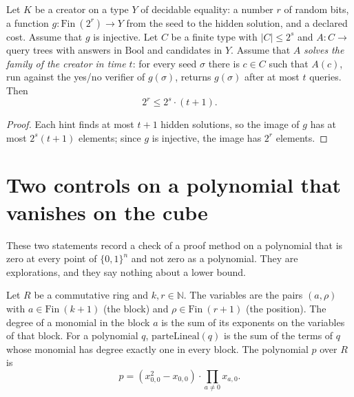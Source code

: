 \begin{theorem}
  \label{thm:barriers-paga-la-informacion}
  \leanok
  Let $K$ be a creator on a type $Y$ of decidable equality: a number $r$ of random bits, a function
  $g : \mathrm{Fin}\ (2^r) \to Y$ from the seed to the hidden solution, and a declared cost. Assume
  that $g$ is injective. Let $C$ be a finite type with $|C| \le 2^s$ and $A : C \to$ query trees with
  answers in $\mathrm{Bool}$ and candidates in $Y$. Assume that $A$ \emph{solves the family of the
  creator in time $t$}: for every seed $\sigma$ there is $c \in C$ such that $A(c)$, run against the
  yes/no verifier of $g(\sigma)$, returns $g(\sigma)$ after at most $t$ queries. Then
  \[
    2^r \le 2^s \cdot (t + 1) .
  \]
  \own{}
\end{theorem}

\begin{proof}
  \leanok
  Each hint finds at most $t + 1$ hidden solutions, so the image of $g$ has at most $2^s (t + 1)$
  elements; since $g$ is injective, the image has $2^r$ elements.
\end{proof}

\section{Two controls on a polynomial that vanishes on the cube}
\label{sec:barriers-controls}

These two statements record a check of a proof method on a polynomial that is zero at every point
of $\{0,1\}^n$ and not zero as a polynomial. They are explorations, and they say nothing about a
lower bound.

\begin{definition}
  \label{def:barriers-linear-part}
  \leanok
  Let $R$ be a commutative ring and $k, r \in \mathbb{N}$. The variables are the pairs $(a, \rho)$ with
  $a \in \mathrm{Fin}\ (k+1)$ (the block) and $\rho \in \mathrm{Fin}\ (r+1)$ (the position). The degree
  of a monomial in the block $a$ is the sum of its exponents on the variables of that block. For a
  polynomial $q$, $\mathrm{parteLineal}(q)$ is the sum of the terms of $q$ whose monomial has degree
  exactly one in every block. The polynomial $p$ over $R$ is
  \[
    p = (x_{0,0}^2 - x_{0,0}) \cdot \prod_{a \ne 0} x_{a,0} .
  \]
  \own{}
  \exploration{}
\end{definition}

